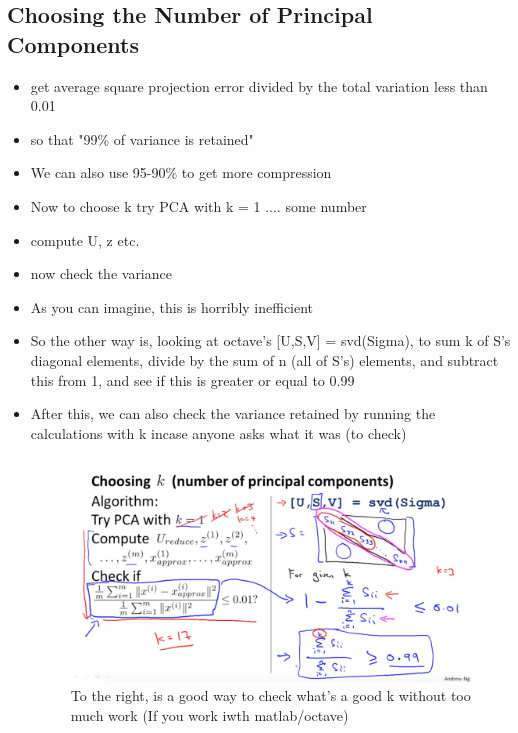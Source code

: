 \documentclass[]{article}
\begin{document}
	\subsection{Choosing the Number of Principal Components}
		\begin{itemize}
			\item get average square projection error divided by the total variation less than 0.01
			\item so that "99\% of variance is retained"
			\item We can also use 95-90\% to get more compression
			\item Now to choose k try PCA with k = 1 .... some number
			\item compute U, z etc.
			\item now check the variance
			\item As you can imagine, this is horribly inefficient
			\item So the other way is, looking at octave's [U,S,V] = svd(Sigma), to sum k of S's diagonal elements, divide by the sum of n (all of S's) elements, and subtract this from 1, and see if this is greater or equal to 0.99
			\item After this, we can also check the variance retained by running the calculations with k incase anyone asks what it was (to check)
			\begin{figure}[ht!]
				\includegraphics[width= 1.5\textwidth,center]{Choosing_K_PCA.png}
				\caption{To the right, is a good way to check what's a good k without too much work (If you work iwth matlab/octave)}
			\end{figure}
		\end{itemize}
		
\end{document}
